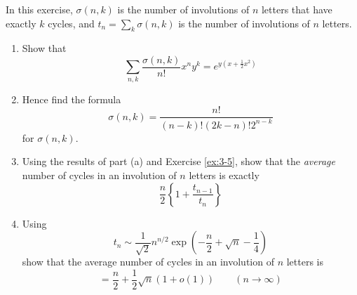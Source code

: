 \begin{exercise}
    In this exercise, $\sigma(n,k)$ is the number of involutions of $n$ letters that have exactly $k$ cycles, and $t_n=\sum_k \sigma(n,k)$ is the number of involutions of $n$ letters.
    \begin{enumerate}[label=(\alph*)]
        \item Show that 
        \[
            \sum_{n,k} \frac{\sigma(n,k)}{n!} x^n y^k = e^{y(x+ \frac{1}{2}x^2)}
        \]
        \item Hence find the formula 
        \[
            \sigma(n,k) = \frac{n!}{(n-k)!(2k-n)!2^{n-k}}
        \]
        for $\sigma(n,k)$.
        \item Using the results of part (a) and Exercise \ref{ex:3-5}, show that the \emph{average} number of cycles in an involution of $n$ letters is exactly
        \[
            \frac{n}{2}\left\{1+\frac{t_{n-1}}{t_n} \right\}
        \]
        \item Using 
        \[
            t_n \sim \frac{1}{\sqrt{2}}n^{n/2}\exp\left(-\frac{n}{2}+\sqrt{n}-\frac{1}{4}\right)
        \]
        show that the average number of cycles in an involution of $n$ letters is 
        \[
            = \frac{n}{2} + \frac{1}{2}\sqrt{n}(1+o(1)) \qquad (n\to \infty)
        \]
    \end{enumerate}
\end{exercise}
